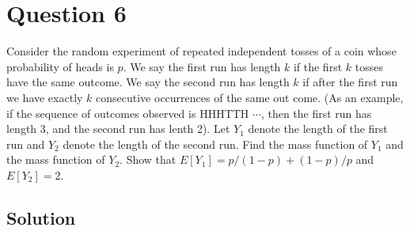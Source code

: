 \section*{Question 6}

Consider the random experiment of repeated independent tosses of a coin whose probability of heads is \( p \).
We say the first run has length \( k \) if the first \( k \) tosses have the same outcome.
We say the second run has length \( k \) if after the first run we have exactly \( k \) consecutive occurrences of the same out come.
(As an example, if the sequence of outcomes observed is HHHTTH \( \cdots \), then the first run has length 3, and the second run has lenth 2).
Let \( Y_{1} \) denote the length of the first run and \( Y_{2} \) denote the length of the second run.
Find the mass function of \( Y_{1} \) and the mass function of \( Y_{2} \).
Show that \( E\left[Y_{1}\right]=p /(1-p)+(1-p) / p \) and \( E\left[Y_{2}\right]=2 \).

\subsection*{Solution}
